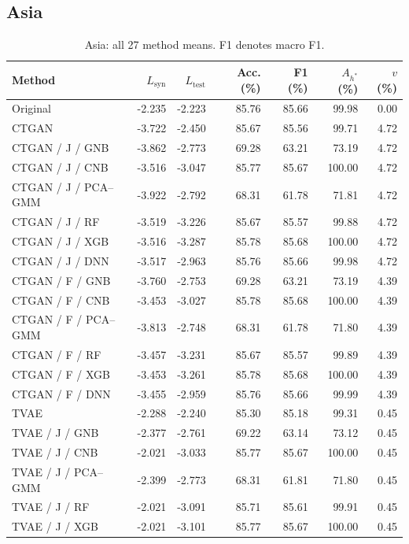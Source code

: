 \documentclass[11pt,letterpaper]{article}
\newcommand{\Lsyn}{L_{\mathrm{syn}}}
\newcommand{\Ltest}{L_{\mathrm{test}}}
\begin{document}
\subsection{Asia}
\begin{table}[H]\centering
\caption{Asia: all 27 method means. F1 denotes macro F1.}\label{tab:all-asia}
\small
\begin{tabular}{lrrrrrr}\toprule
Method & $\Lsyn$ & $\Ltest$ & Acc. (\%) & F1 (\%) & $A_{h^*}$ (\%) & $v$ (\%)\\\midrule
Original & -2.235 & -2.223 & 85.76 & 85.66 & 99.98 & 0.00\\
CTGAN & -3.722 & -2.450 & 85.67 & 85.56 & 99.71 & 4.72\\
CTGAN / J / GNB & -3.862 & -2.773 & 69.28 & 63.21 & 73.19 & 4.72\\
CTGAN / J / CNB & -3.516 & -3.047 & 85.77 & 85.67 & 100.00 & 4.72\\
CTGAN / J / PCA--GMM & -3.922 & -2.792 & 68.31 & 61.78 & 71.81 & 4.72\\
CTGAN / J / RF & -3.519 & -3.226 & 85.67 & 85.57 & 99.88 & 4.72\\
CTGAN / J / XGB & -3.516 & -3.287 & 85.78 & 85.68 & 100.00 & 4.72\\
CTGAN / J / DNN & -3.517 & -2.963 & 85.76 & 85.66 & 99.98 & 4.72\\
CTGAN / F / GNB & -3.760 & -2.753 & 69.28 & 63.21 & 73.19 & 4.39\\
CTGAN / F / CNB & -3.453 & -3.027 & 85.78 & 85.68 & 100.00 & 4.39\\
CTGAN / F / PCA--GMM & -3.813 & -2.748 & 68.31 & 61.78 & 71.80 & 4.39\\
CTGAN / F / RF & -3.457 & -3.231 & 85.67 & 85.57 & 99.89 & 4.39\\
CTGAN / F / XGB & -3.453 & -3.261 & 85.78 & 85.68 & 100.00 & 4.39\\
CTGAN / F / DNN & -3.455 & -2.959 & 85.76 & 85.66 & 99.99 & 4.39\\
TVAE & -2.288 & -2.240 & 85.30 & 85.18 & 99.31 & 0.45\\
TVAE / J / GNB & -2.377 & -2.761 & 69.22 & 63.14 & 73.12 & 0.45\\
TVAE / J / CNB & -2.021 & -3.033 & 85.77 & 85.67 & 100.00 & 0.45\\
TVAE / J / PCA--GMM & -2.399 & -2.773 & 68.31 & 61.81 & 71.80 & 0.45\\
TVAE / J / RF & -2.021 & -3.091 & 85.71 & 85.61 & 99.91 & 0.45\\
TVAE / J / XGB & -2.021 & -3.101 & 85.77 & 85.67 & 100.00 & 0.45\\

\end{tabular}
\end{table}
\end{document}
